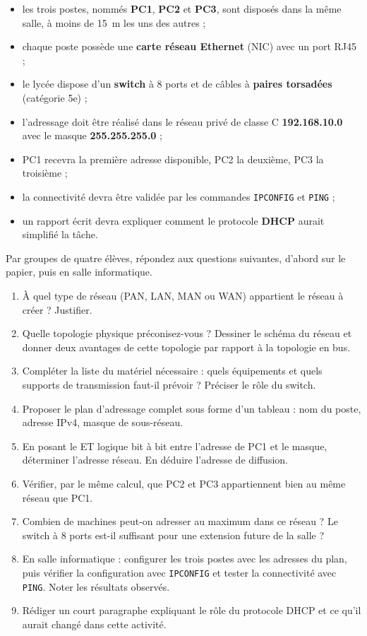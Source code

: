 \documentclass[11pt]{article}
\newcounter{popsec}
\newcounter{popsub}
\newcommand{\courssub}[1]{%
  \stepcounter{popsub}%
  \par\vspace{9pt}\noindent{\popxbold\fontsize{11.5}{13}\selectfont\color{popink}{\color{poporange}\thepopsec.\thepopsub}\hspace{6pt}#1}\par\nopagebreak\vspace{4pt}
}
\begin{document}
\begin{itemize}
\item les trois postes, nommés \textbf{PC1}, \textbf{PC2} et \textbf{PC3}, sont disposés dans la même salle, à moins de \SI{15}{\meter} les uns des autres ;
\item chaque poste possède une \textbf{carte réseau Ethernet} (NIC) avec un port RJ45 ;
\item le lycée dispose d'un \textbf{switch} à 8 ports et de câbles à \textbf{paires torsadées} (catégorie 5e) ;
\item l'adressage doit être réalisé dans le réseau privé de classe C \textbf{192.168.10.0} avec le masque \textbf{255.255.255.0} ;
\item PC1 recevra la première adresse disponible, PC2 la deuxième, PC3 la troisième ;
\item la connectivité devra être validée par les commandes \texttt{IPCONFIG} et \texttt{PING} ;
\item un rapport écrit devra expliquer comment le protocole \textbf{DHCP} aurait simplifié la tâche.
\end{itemize}

\courssub{Consignes}

Par groupes de quatre élèves, répondez aux questions suivantes, d'abord sur le papier, puis en salle informatique.

\begin{enumerate}
\item À quel type de réseau (PAN, LAN, MAN ou WAN) appartient le réseau à créer ? Justifier.
\item Quelle topologie physique préconisez-vous ? Dessiner le schéma du réseau et donner deux avantages de cette topologie par rapport à la topologie en bus.
\item Compléter la liste du matériel nécessaire : quels équipements et quels supports de transmission faut-il prévoir ? Préciser le rôle du switch.
\item Proposer le plan d'adressage complet sous forme d'un tableau : nom du poste, adresse IPv4, masque de sous-réseau.
\item En posant le ET logique bit à bit entre l'adresse de PC1 et le masque, déterminer l'adresse réseau. En déduire l'adresse de diffusion.
\item Vérifier, par le même calcul, que PC2 et PC3 appartiennent bien au même réseau que PC1.
\item Combien de machines peut-on adresser au maximum dans ce réseau ? Le switch à 8 ports est-il suffisant pour une extension future de la salle ?
\item En salle informatique : configurer les trois postes avec les adresses du plan, puis vérifier la configuration avec \texttt{IPCONFIG} et tester la connectivité avec \texttt{PING}. Noter les résultats observés.
\item Rédiger un court paragraphe expliquant le rôle du protocole DHCP et ce qu'il aurait changé dans cette activité.
\end{enumerate}
\end{document}
